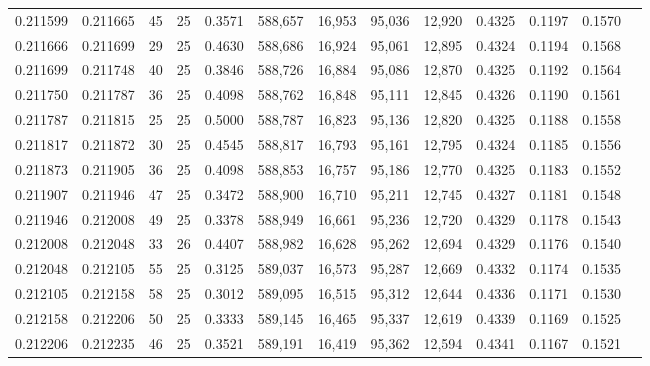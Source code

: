 \begin{tabular}{rrrrrrrrrrrrr}
0.211599 & 0.211665 &  45 &  25 &                                     0.3571 & 588,657 &  16,953 &  95,036 &  12,920 & 0.4325 & 0.1197 & 0.1570 \\
0.211666 & 0.211699 &  29 &  25 &                                     0.4630 & 588,686 &  16,924 &  95,061 &  12,895 & 0.4324 & 0.1194 & 0.1568 \\
0.211699 & 0.211748 &  40 &  25 &                                     0.3846 & 588,726 &  16,884 &  95,086 &  12,870 & 0.4325 & 0.1192 & 0.1564 \\
0.211750 & 0.211787 &  36 &  25 &                                     0.4098 & 588,762 &  16,848 &  95,111 &  12,845 & 0.4326 & 0.1190 & 0.1561 \\
0.211787 & 0.211815 &  25 &  25 &                                     0.5000 & 588,787 &  16,823 &  95,136 &  12,820 & 0.4325 & 0.1188 & 0.1558 \\
0.211817 & 0.211872 &  30 &  25 &                                     0.4545 & 588,817 &  16,793 &  95,161 &  12,795 & 0.4324 & 0.1185 & 0.1556 \\
0.211873 & 0.211905 &  36 &  25 &                                     0.4098 & 588,853 &  16,757 &  95,186 &  12,770 & 0.4325 & 0.1183 & 0.1552 \\
0.211907 & 0.211946 &  47 &  25 &                                     0.3472 & 588,900 &  16,710 &  95,211 &  12,745 & 0.4327 & 0.1181 & 0.1548 \\
0.211946 & 0.212008 &  49 &  25 &                                     0.3378 & 588,949 &  16,661 &  95,236 &  12,720 & 0.4329 & 0.1178 & 0.1543 \\
0.212008 & 0.212048 &  33 &  26 &                                     0.4407 & 588,982 &  16,628 &  95,262 &  12,694 & 0.4329 & 0.1176 & 0.1540 \\
0.212048 & 0.212105 &  55 &  25 &                                     0.3125 & 589,037 &  16,573 &  95,287 &  12,669 & 0.4332 & 0.1174 & 0.1535 \\
0.212105 & 0.212158 &  58 &  25 &                                     0.3012 & 589,095 &  16,515 &  95,312 &  12,644 & 0.4336 & 0.1171 & 0.1530 \\
0.212158 & 0.212206 &  50 &  25 &                                     0.3333 & 589,145 &  16,465 &  95,337 &  12,619 & 0.4339 & 0.1169 & 0.1525 \\
0.212206 & 0.212235 &  46 &  25 &                                     0.3521 & 589,191 &  16,419 &  95,362 &  12,594 & 0.4341 & 0.1167 & 0.1521 \\

\end{tabular}
